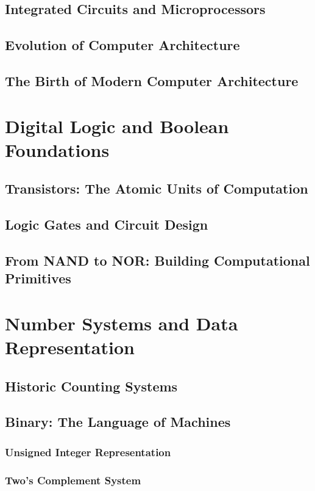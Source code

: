 \documentclass[12pt, oneside]{book}
\begin{document}
	\section{Integrated Circuits and Microprocessors}
	
	\section{Evolution of Computer Architecture}
	\section{The Birth of Modern Computer Architecture}
	
	\chapter{Digital Logic and Boolean Foundations}
	\section{Transistors: The Atomic Units of Computation}
	\section{Logic Gates and Circuit Design}
	\section{From NAND to NOR: Building Computational Primitives}
	
	\chapter{Number Systems and Data Representation}
	\section{Historic Counting Systems}
	\section{Binary: The Language of Machines}
	\subsection{Unsigned Integer Representation}
	\subsection{Two's Complement System}
\end{document}
